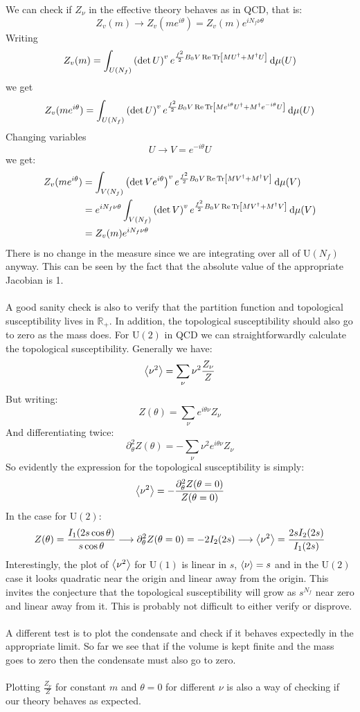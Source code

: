 \documentclass[a4,10pt,titlepage]{article}
\renewcommand\[{\begin{equation*}}
\renewcommand\]{\end{equation*}}
\newcommand{\be}{\begin{equation}}
\newcommand{\ee}{\end{equation}}
\numberwithin{equation}{section}
\newcommand{\lp}{\left}
\newcommand{\rp}{\right}
\begin{document}
We can check if $Z_\nu$ in the effective theory behaves as in QCD, that is:
\be
Z_v(m)\rightarrow Z_v(me^{i\theta})=Z_v(m)e^{iN_f\nu\theta}
\ee
Writing
\be
Z_v(m)=\int_{U(N_f)}\lp(\det U\rp)^v e^{\frac{f^2}{2}B_0 V\Re \Tr[MU^\dagger +M^\dagger U]}\:\dd\mu(U)
\ee
we get
\be
Z_v(me^{i\theta})=\int_{U(N_f)}\lp(\det U\rp)^v e^{\frac{f^2}{2}B_0 V\Re \Tr[Me^{i\theta}U^\dagger +M^\dagger e^{-i\theta}U]}\:\dd\mu(U)
\ee
Changing variables 
\be
U\rightarrow V=e^{-i\theta}U
\ee
we get:
\begin{align}
Z_v(me^{i\theta})&=\int_{V(N_f)}\lp(\det Ve^{i\theta}\rp)^v e^{\frac{f^2}{2}B_0 V\Re \Tr[MV^\dagger +M^\dagger V]}\:\dd\mu(V) \\
&=e^{iN_f\nu\theta}\int_{V(N_f)}\lp(\det V\rp)^v e^{\frac{f^2}{2}B_0 V\Re \Tr[MV^\dagger +M^\dagger V]}\:\dd\mu(V)\\
&=Z_v(m)e^{iN_f\nu\theta}
\end{align}
There is no change in the measure since we are integrating over all of U$(N_f)$ anyway. This can be seen by the fact that the absolute value of the appropriate Jacobian is 1. 
\\
\\
A good sanity check is also to verify that the partition function and topological susceptibility lives in $\mathbb{R}_+$. In addition, the topological susceptibility should also go to zero as the mass does. For U$(2)$ in QCD we can straightforwardly calculate the topological susceptibility. Generally we have:
\be
\expval{\nu^2}=\sum_\nu \nu^2\frac{Z_\nu}{Z}
\ee
But writing:
\be
Z(\theta)=\sum_\nu e^{i\theta\nu}Z_\nu
\ee
And differentiating twice:
\be
\partial_{\theta}^2 Z(\theta)=-\sum_\nu \nu^2e^{i\theta\nu}{Z_\nu}
\ee
So evidently the expression for the topological susceptibility is simply:
\be
\expval{\nu^2}=-\frac{\partial_{\theta}^2 Z(\theta=0)}{Z(\theta=0)}
\ee
In the case for U$(2)$:
\be
Z(\theta)=\frac{I_1(2s\cos\theta)}{s\cos\theta} \longrightarrow \partial_\theta^2Z(\theta=0)=-2I_2(2s)\longrightarrow \expval{\nu^2}=\frac{2sI_2(2s)}{I_1(2s)}
\ee
Interestingly, the plot of $\expval{\nu^2}$ for U$(1)$ is linear in $s$, $\expval{\nu}=s$ and in the U$(2)$ case it looks quadratic near the origin and linear away from the origin. This invites the conjecture that the topological susceptibility will grow as $s^{N_f}$ near zero and linear away from it. This is probably not difficult to either verify or disprove. 
\\
\\
A different test is to plot the condensate and check if it behaves expectedly in the appropriate limit. So far we see that if the volume is kept finite and the mass goes to zero then the condensate must also go to zero. 
\\
\\
Plotting $\frac{Z_\nu}{Z}$ for constant $m$ and $\theta=0$ for different $\nu$ is also a way of checking if our theory behaves as expected.
\end{document}
